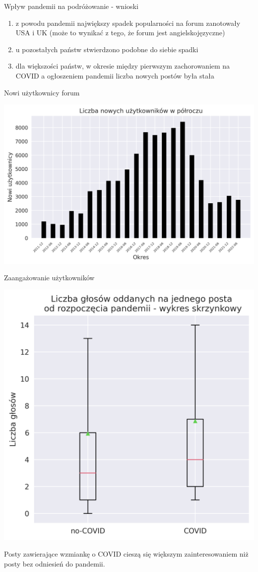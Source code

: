 \documentclass[./main.tex]{subfiles}
\begin{document}
\begin{frame}{Wpływ pandemii na podróżowanie - wnioski}
    \begin{enumerate}
        \item z powodu pandemii największy spadek popularności na forum zanotowały USA i UK (może to wynikać z tego, że forum jest angielskojęzyczne)
        \item u pozostałych państw stwierdzono podobne do siebie spadki
        \item dla większości państw, w okresie między pierwszym zachorowaniem na COVID a ogłoszeniem pandemii liczba nowych postów była stała
    \end{enumerate}
\end{frame}

\begin{frame}{Nowi użytkownicy forum}
    \begin{center}
    \includegraphics[width=\textwidth]{travel/new-users.png}
    \end{center}
\end{frame}

\begin{frame}{Zaangażowanie użytkowników}
    \begin{center}
    \includegraphics[height=0.67\textheight]{travel/votes.png}
    \end{center}
    Posty zawierające wzmiankę o COVID cieszą się większym zainteresowaniem niż posty bez odniesień do pandemii. 
\end{frame}
\end{document}
